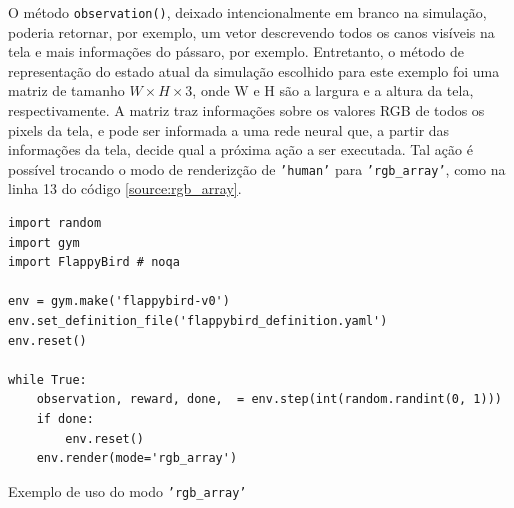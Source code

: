 \documentclass[cic,tc]{iiufrgs}
\newenvironment{longlisting}{\captionsetup{type=listing}}{}
\begin{document}
O método \texttt{observation()}, deixado intencionalmente em branco na simulação,
poderia retornar, por exemplo, um vetor descrevendo todos os canos visíveis na
tela e mais informações do pássaro, por exemplo. Entretanto, o método de representação
do estado atual da simulação escolhido para este exemplo foi uma matriz de tamanho
$W \times H \times 3$, onde W e H são a largura e a altura da tela, respectivamente.
A matriz traz informações sobre os valores RGB de todos os pixels da tela, e pode
ser informada a uma rede neural que, a partir das informações da tela, decide
qual a próxima ação a ser executada. Tal ação é possível trocando o modo de
renderizção de \texttt{'human'} para \texttt{'rgb\_array'}, como na linha 13  do
código \ref{source:rgb_array}.


\begin{longlisting}
\begin{verbatim}
import random
import gym
import FlappyBird # noqa

env = gym.make('flappybird-v0')
env.set_definition_file('flappybird_definition.yaml')
env.reset()

while True:
    observation, reward, done,  = env.step(int(random.randint(0, 1)))
    if done:
        env.reset()
    env.render(mode='rgb_array')

\end{verbatim}
\caption[Cópia de DNA]{Exemplo de uso do modo \texttt{'rgb\_array'}}
\label{source:rgb_array}
\end{longlisting}
\end{document}
